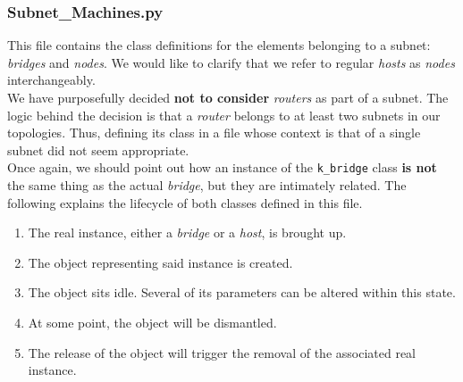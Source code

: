 \subsubsection{Subnet\_Machines.py}
    This file contains the class definitions for the elements belonging to a subnet: \textit{bridges} and \textit{nodes}. We would like to clarify that we refer to regular \textit{hosts} as \textit{nodes} interchangeably.\\

    We have purposefully decided \textbf{not to consider} \textit{routers} as part of a subnet. The logic behind the decision is that a \textit{router} belongs to at least two subnets in our topologies. Thus, defining its class in a file whose context is that of a single subnet did not seem appropriate.\\

    Once again, we should point out how an instance of the \texttt{k\_bridge} class \textbf{is not} the same thing as the actual \textit{bridge}, but they are intimately related. The following explains the lifecycle of both classes defined in this file.\\

    \begin{enumerate}
        \item The real instance, either a \textit{bridge} or a \textit{host}, is brought up.
        \item The object representing said instance is created.
        \item The object sits idle. Several of its parameters can be altered within this state.
        \item At some point, the object will be dismantled.
        \item The release of the object will trigger the removal of the associated real instance.
    \end{enumerate}

